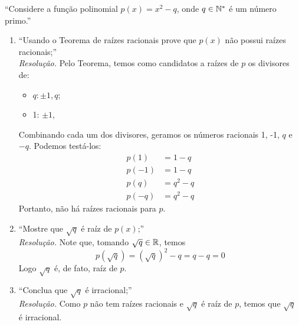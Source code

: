 \enquote{Considere a função polinomial $p(x) = x^2 - q$, onde $q \in \mathbb N^*$ é um número primo.}
\begin{enumerate}
    \item \enquote{Usando o Teorema de raízes racionais prove que $p(x)$ não possui raízes racionais;} \\
    \emph{Resolução.}
    Pelo Teorema, temos como candidatos a raízes de $p$ os divisores de:
    \begin{itemize}
        \item $q: \pm 1, q$;
        \item 1: $\pm 1$,
    \end{itemize}
    Combinando cada um dos divisores, geramos os números racionais 1, -1, $q$ e $-q$. Podemos testá-los:
    \begin{align*}
        p(1) &= 1 - q \\
        p(-1) &= 1 - q \\
        p(q) &= q^2 - q \\
        p(-q) &= q^2 - q
    \end{align*}
    Portanto, não há raízes racionais para $p$.
    \item \enquote{Mostre que $\sqrt{q}$ é raíz de $p(x)$;} \\
    \emph{Resolução.} Note que, tomando $\sqrt{q} \in \mathbb R$, temos 
    \begin{displaymath}
        p(\sqrt{q}) = (\sqrt{q})^2 - q = q - q = 0        
    \end{displaymath}
    Logo $\sqrt{q}$ é, de fato, raíz de $p$.
    \item \enquote{Conclua que $\sqrt{q}$ é irracional;} \\
    \emph{Resolução.} Como $p$ não tem raízes racionais e $\sqrt{q}$ é raíz de $p$, temos que $\sqrt{q}$ é irracional.
\end{enumerate}